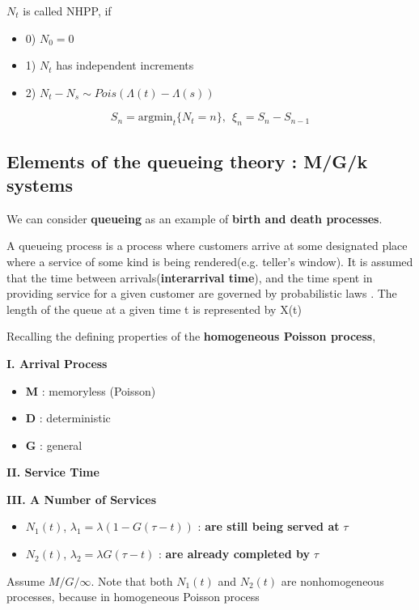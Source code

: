 \documentclass[12pt]{article}
\theoremstyle{nonumberbreak}
\begin{document}
$N_t$ is called NHPP, if 

\begin{itemize}
	\item 0) $N_0 = 0$
	\item 1) $N_t$ has independent increments
	\item 2) $N_t - N_s \sim Pois(\Lambda(t) - \Lambda(s))$
\end{itemize}

$$
S_n = \mathrm{argmin}_t \{ N_t =n \}, \ \ \xi_n = S_n - S_{n-1}
$$

\subsection{Elements of the queueing theory : M/G/k systems}

We can consider \textbf{queueing} as an example of \textbf{birth and death processes}. 

A queueing process is a process where customers arrive at some designated place where a service of some kind is being rendered(e.g. teller's window). It is assumed that the time between arrivals(\textbf{interarrival time}), and the time spent in providing service for a given
customer are governed by probabilistic laws . The length of the queue at a
given time t is represented by X(t)


Recalling the defining properties of the \textbf{homogeneous Poisson process}, 

\textbf{I. Arrival Process}

\begin{itemize}
	\item \textbf{M} : memoryless (Poisson)
	\item \textbf{D} : deterministic
	\item \textbf{G} : general
\end{itemize}


\textbf{II. Service Time}

\textbf{III. A Number of Services}


\begin{itemize}
	\item $N_1(t)$, $\lambda_1 = \lambda (1 - G(\tau - t) )$ : \textbf{are still being served at} $\tau$
	\item $N_2(t)$, $\lambda_2 = \lambda G(\tau - t)$ : \textbf{are already completed by} $\tau$
\end{itemize}



Assume $M/G/\infty$. Note that both $N_1(t)$ and $N_2(t)$ are nonhomogeneous processes, because in homogeneous Poisson process
\end{document}

